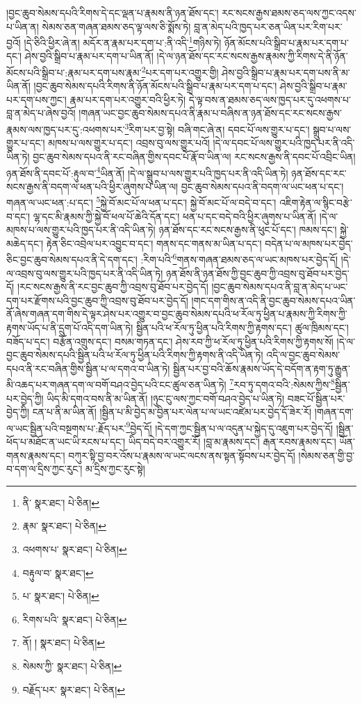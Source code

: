 །བྱང་ཆུབ་སེམས་དཔའི་རིགས་དེ་དང་ལྡན་པ་རྣམས་ནི་ཉན་ཐོས་དང་། རང་སངས་རྒྱས་ཐམས་ཅད་ལས་ཀྱང་འདས་པ་ཡིན་ན། སེམས་ཅན་གཞན་ཐམས་ཅད་ལྟ་ལས་ཅི་སྨོས་ཏེ། བླ་ན་མེད་པའི་ཁྱད་པར་ཅན་ཡིན་པར་རིག་པར་བྱའོ། །དེ་ཅིའི་ཕྱིར་ཞེ་ན། མདོར་ན་རྣམ་པར་དག་པ་:ནི་འདི་\footnote{ནི་  སྣར་ཐང་།  པེ་ཅིན། }གཉིས་ཏེ། ཉོན་མོངས་པའི་སྒྲིབ་པ་རྣམ་པར་དག་པ་དང་། ཤེས་བྱའི་སྒྲིབ་པ་རྣམ་པར་དག་པ་ཡིན་ནོ། །དེ་ལ་ཉན་ཐོས་དང་རང་སངས་རྒྱས་རྣམས་ཀྱི་རིགས་དེ་ནི་ཉོན་མོངས་པའི་སྒྲིབ་པ་:རྣམ་པར་དག་པས་རྣམ་\footnote{རྣམ་  སྣར་ཐང་།  པེ་ཅིན། }པར་དག་པར་འགྱུར་གྱི། ཤེས་བྱའི་སྒྲིབ་པ་རྣམ་པར་དག་པས་ནི་མ་ཡིན་ནོ། །བྱང་ཆུབ་སེམས་དཔའི་རིགས་ནི་ཉོན་མོངས་པའི་སྒྲིབ་པ་རྣམ་པར་དག་པ་དང་། ཤེས་བྱའི་སྒྲིབ་པ་རྣམ་པར་དག་པས་ཀྱང་། རྣམ་པར་དག་པར་འགྱུར་བའི་ཕྱིར་ཏེ། དེ་ལྟ་བས་ན་ཐམས་ཅད་ལས་ཁྱད་པར་དུ་འཕགས་པ་བླ་ན་མེད་པ་ཞེས་བྱའོ། །གཞན་ཡང་བྱང་ཆུབ་སེམས་དཔའ་ནི་རྣམ་པ་བཞིས་ན་ཉན་ཐོས་དང་རང་སངས་རྒྱས་རྣམས་ལས་ཁྱད་པར་དུ་:འཕགས་པར་\footnote{འཕགས་པ་  སྣར་ཐང་།  པེ་ཅིན། }རིག་པར་བྱ་སྟེ། བཞི་གང་ཞེ་ན། དབང་པོ་ལས་གྱུར་པ་དང་། སྒྲུབ་པ་ལས་གྱུར་པ་དང་། མཁས་པ་ལས་གྱུར་པ་དང་། འབྲས་བུ་ལས་གྱུར་པའོ། །དེ་ལ་དབང་པོ་ལས་གྱུར་པའི་ཁྱད་པར་ནི་འདི་ཡིན་ཏེ། བྱང་ཆུབ་སེམས་དཔའ་ནི་རང་བཞིན་གྱིས་དབང་པོ་རྣོ་བ་ཡིན་ལ། རང་སངས་རྒྱས་ནི་དབང་པོ་འབྲིང་ཡིན། ཉན་ཐོས་ནི་དབང་པོ་:རྟུལ་བ་\footnote{བརྟུལ་བ་  སྣར་ཐང་། }ཡིན་ནོ། །དེ་ལ་སྒྲུབ་པ་ལས་གྱུར་པའི་ཁྱད་པར་ནི་འདི་ཡིན་ཏེ། ཉན་ཐོས་དང་རང་སངས་རྒྱས་ནི་བདག་ལ་ཕན་པའི་ཕྱིར་ཞུགས་པ་ཡིན་ལ། བྱང་ཆུབ་སེམས་དཔའ་ནི་བདག་ལ་ཡང་ཕན་པ་དང་། གཞན་ལ་ཡང་ཕན་:པ་དང་། \footnote{པ་  སྣར་ཐང་།  པེ་ཅིན། }སྐྱེ་བོ་མང་པོ་ལ་ཕན་པ་དང་། སྐྱེ་བོ་མང་པོ་ལ་བདེ་བ་དང་། འཇིག་རྟེན་ལ་སྙིང་བརྩེ་བ་དང་། ལྷ་དང་མི་རྣམས་ཀྱི་སྐྱེ་བོ་ཕལ་པོ་ཆེའི་དོན་དང་། ཕན་པ་དང་བདེ་བའི་ཕྱིར་ཞུགས་པ་ཡིན་ནོ། །དེ་ལ་མཁས་པ་ལས་གྱུར་པའི་ཁྱད་པར་ནི་འདི་ཡིན་ཏེ། ཉན་ཐོས་དང་རང་སངས་རྒྱས་ནི་ཕུང་པོ་དང་། ཁམས་དང་། སྐྱེ་མཆེད་དང་། རྟེན་ཅིང་འབྲེལ་པར་འབྱུང་བ་དང་། གནས་དང་གནས་མ་ཡིན་པ་དང་། བདེན་པ་ལ་མཁས་པར་བྱེད་ཅིང་བྱང་ཆུབ་སེམས་དཔའ་ནི་དེ་དག་དང་། :རིག་པའི་\footnote{རིགས་པའི་  སྣར་ཐང་།  པེ་ཅིན། }གནས་གཞན་ཐམས་ཅད་ལ་ཡང་མཁས་པར་བྱེད་དོ། །དེ་ལ་འབྲས་བུ་ལས་གྱུར་པའི་ཁྱད་པར་ནི་འདི་ཡིན་ཏེ། ཉན་ཐོས་ནི་ཉན་ཐོས་ཀྱི་བྱང་ཆུབ་ཀྱི་འབྲས་བུ་ཐོབ་པར་བྱེད་དོ། །རང་སངས་རྒྱས་ནི་རང་བྱང་ཆུབ་ཀྱི་འབྲས་བུ་ཐོབ་པར་བྱེད་དོ། །བྱང་ཆུབ་སེམས་དཔའ་ནི་བླ་ན་མེད་པ་ཡང་དག་པར་རྫོགས་པའི་བྱང་ཆུབ་ཀྱི་འབྲས་བུ་ཐོབ་པར་བྱེད་དོ། །གང་དག་གིས་ན་འདི་ནི་བྱང་ཆུབ་སེམས་དཔའ་ཡིན་ནོ་ཞེས་གཞན་དག་གིས་དེ་ལྟར་ཤེས་པར་འགྱུར་བ་བྱང་ཆུབ་སེམས་དཔའི་ཕ་རོལ་ཏུ་ཕྱིན་པ་རྣམས་ཀྱི་རིགས་ཀྱི་རྟགས་ཡོད་པ་ནི་དྲུག་པོ་འདི་དག་ཡིན་ཏེ། སྦྱིན་པའི་ཕ་རོལ་ཏུ་ཕྱིན་པའི་རིགས་ཀྱི་རྟགས་དང་། ཚུལ་ཁྲིམས་དང་། བཟོད་པ་དང་། བརྩོན་འགྲུས་དང་། བསམ་གཏན་དང་། ཤེས་རབ་ཀྱི་ཕ་རོལ་ཏུ་ཕྱིན་པའི་རིགས་ཀྱི་རྟགས་སོ། །དེ་ལ་བྱང་ཆུབ་སེམས་དཔའི་སྦྱིན་པའི་ཕ་རོལ་ཏུ་ཕྱིན་པའི་རིགས་ཀྱི་རྟགས་ནི་འདི་ཡིན་ཏེ། འདི་ལ་བྱང་ཆུབ་སེམས་དཔའ་ནི་རང་བཞིན་གྱིས་སྦྱིན་པ་ལ་དགའ་བ་ཡིན་ཏེ། སྦྱིན་པར་བྱ་བའི་ཆོས་རྣམས་ཡོད་དེ་བདོག་ན་རྟག་ཏུ་རྒྱུན་མི་འཆད་པར་གཞན་དག་ལ་བགོ་བཤའ་བྱེད་པའི་ངང་ཚུལ་ཅན་ཡིན་ཏེ། \footnote{ནོ། །   སྣར་ཐང་།  པེ་ཅིན། }རབ་ཏུ་དགའ་བའི་:སེམས་ཀྱིས་\footnote{སེམས་ཀྱི་  སྣར་ཐང་།  པེ་ཅིན། }སྦྱིན་པར་བྱེད་ཀྱི། ཡིད་མི་དགའ་བས་ནི་མ་ཡིན་ནོ། །ཉུང་ངུ་ལས་ཀྱང་བགོ་བཤའ་བྱེད་པ་ཡིན་ཏེ། བཟང་པོ་སྦྱིན་པར་བྱེད་ཀྱི། ངན་པ་ནི་མ་ཡིན་ནོ། །སྦྱིན་པ་མི་བྱེད་མ་བྱིན་པར་ལེན་པ་ལ་ཡང་འཛེམ་པར་བྱེད་དོ་ཟེར་རོ། །གཞན་དག་ལ་ཡང་སྦྱིན་པའི་བསྔགས་པ་:རྗོད་པར་\footnote{བརྗོད་པར་  སྣར་ཐང་།  པེ་ཅིན། }བྱེད་དོ། །དེ་དག་ཀྱང་སྦྱིན་པ་ལ་འདུན་པ་སྐྱེད་དུ་འཇུག་པར་བྱེད་དོ། །སྦྱིན་ཕོད་པ་མཐོང་ན་ཡང་ཡི་རངས་པ་དང་། ཡིད་བདེ་བར་འགྱུར་རོ། །བླ་མ་རྣམས་དང་། རྒན་རབས་རྣམས་དང་། ཡོན་གནས་རྣམས་དང་། བཀུར་སྟི་བྱ་བར་འོས་པ་རྣམས་ལ་ཡང་ལངས་ནས་སྟན་སྟོབས་པར་བྱེད་དོ། །སེམས་ཅན་གྱི་བྱ་བ་དག་ལ་དྲིས་ཀྱང་རུང་། མ་དྲིས་ཀྱང་རུང་སྟེ། 